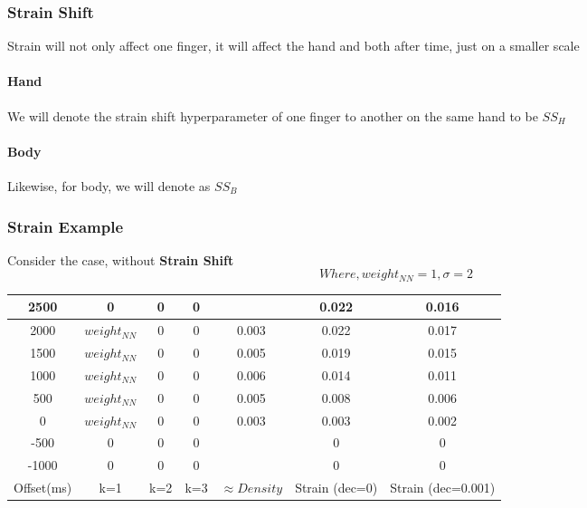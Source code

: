 \documentclass{article}
\begin{document}
\subsubsection{Strain Shift}

Strain will not only affect one finger, it will affect the hand and both after time, just on a smaller scale

\paragraph{Hand} We will denote the strain shift hyperparameter of one finger to another on the same hand to be $SS_H$
\paragraph{Body} Likewise, for body, we will denote as $SS_B$

\subsubsection{Strain Example}

Consider the case, without \textbf{Strain Shift}
$$ Where, weight_{NN} = 1, \sigma = 2 $$
\begin{center}
	\begin{tabular}{|c|c|c|c|c|c|c|} 
	\hline
	2500 & 0 			& 0 & 0 &       & 0.022 & 0.016\\ \hline
	2000 & $weight_{NN}$& 0 & 0 & 0.003 & 0.022 & 0.017\\	\hline
	1500 & $weight_{NN}$& 0 & 0 & 0.005 & 0.019 & 0.015\\	\hline
	1000 & $weight_{NN}$& 0 & 0 & 0.006 & 0.014 & 0.011\\	\hline
	 500 & $weight_{NN}$& 0 & 0 & 0.005 & 0.008 & 0.006\\	\hline
	   0 & $weight_{NN}$& 0 & 0 & 0.003 & 0.003 & 0.002\\	\hline
    -500 & 0 			& 0 & 0 & 		& 0	 	& 0	\\	\hline
   -1000 & 0 			& 0 & 0 & 		& 0	 	& 0	\\
	\hline
	Offset(ms) & k=1 & k=2 & k=3 & $\approx Density$ & Strain (dec=0) & Strain (dec=0.001) \\ 
	\hline
\end{tabular}
\end{center}
\end{document}
